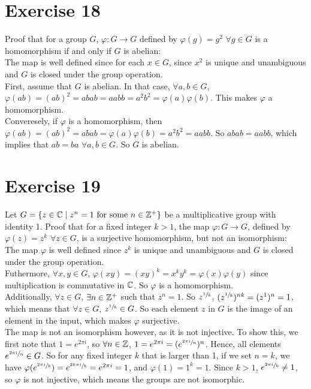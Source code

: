 \documentclass[12pt]{article}
\begin{document}
    \section*{Exercise 18}
    Proof that for a group $G$, $\varphi: G \to G$
    defined by $\varphi(g) = g^2$ $\forall g \in G$
    is a homomorphism if and only if $G$ is abelian: \\
    The map is well defined since for each $x \in G$, since $x^2$ is unique
    and unambiguous and $G$ is closed under the group operation. \\
    First, assume that $G$ is abelian.
    In that case, $\forall a, b \in G$,
    $\varphi(ab) = (ab)^2
    = abab
    = aabb
    = a^2b^2
    = \varphi(a)\varphi(b)$.
    This makes $\varphi$ a homomorphism. \\ 
    Converesely, if $\varphi$ is a homomorphism,
    then $\varphi(ab) = (ab)^{2}
    = abab
    = \varphi(a)\varphi(b)
    = a^{2}b^{2} 
    = aabb$.
    So $abab = aabb$,
    which implies that $ab = ba$ $\forall a, b \in G$.
    So $G$ is abelian.
    

    \section*{Exercise 19}
    Let $G = \{z \in \mathbb{C} \mid z^n = 1 \text{ for some } n \in \mathbb{Z}^+ \}$
    be a multiplicative group with identity 1.
    Proof that for a fixed integer $k > 1$,
    the map $\varphi: G \to G$,
    defined by $\varphi(z) = z^k$ $\forall z \in G$,
    is a surjective homomorphism, but not an isomorphism: \\
    The map $\varphi$ is well defined since $z^k$ is unique
    and unambiguous and $G$ is closed under the group operation. \\
    Futhermore, $\forall x, y \in G$,
    $\varphi(xy) = (xy)^k = x^ky^k = \varphi(x)\varphi(y)$
    since multiplication is commutative in $\mathbb{C}$. 
    So $\varphi$ is a homomorphism. \\
    Additionally, $\forall z \in G$, $\exists n \in \mathbb{Z}^+$
    such that $z^n = 1$.
    So $z^{\sfrac{1}{k}}$, $(z^{\sfrac{1}{k}})^{nk} = (z^1)^{n} = 1$,
    which means that $\forall z \in G$, $z^{\sfrac{1}{k}} \in G$.
    So each element $z$ in $G$ is the image of an element in the input,
    which makes $\varphi$ surjective. \\
    The map is not an isomorphism however, as it is not injective.
    To show this, we first note that $1 = e^{2 \pi i}$,
    so $\forall n \in \mathbb{Z}$, $1 = e^{2 \pi i} = (e^{\sfrac{2 \pi i}{n}})^n$.
    Hence, all elements $e^{\sfrac{2 \pi i}{n}} \in G$.
    So for any fixed integer $k$ that is larger than 1,
    if we set $n = k$,
    we have $\varphi(e^{\sfrac{2 \pi i}{k}}) = e^{\sfrac{2k \pi i}{k}}
    = e^{2 \pi i} = 1$,
    and $\varphi(1) = 1^k = 1$.
    Since $k > 1$, $e^{\sfrac{2 \pi i}{k}} \neq 1$,
    so $\varphi$ is not injective,
    which means the groups are not isomorphic.
    
\end{document}
